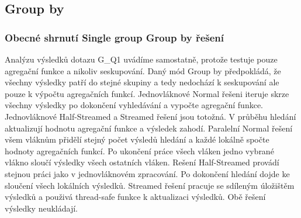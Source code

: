 \subsection{Group by}

\subsubsection{Obecné shrnutí Single group Group by řešení}

Analýzu výsledků dotazu G\_Q1 uvádíme samostatně, protože testuje pouze agregační funkce a nikoliv seskupování.
Daný mód Group by předpokládá, že všechny výsledky patří do stejné skupiny a tedy nedochází k seskupování ale pouze k výpočtu agregačních funkcí.
Jednovláknové Normal řešeni iteruje skrze všechny výsledky po dokončení vyhledávání a vypočte agregační funkce.
Jednovláknové Half-Streamed a Streamed řešení jsou totožná.
V průběhu hledání aktualizují hodnotu agregační funkce a výsledek zahodí. 
Paralelní Normal řešení všem vláknům přidělí stejný počet výsledů hledání a každé lokálně spočte hodnoty agregačních funkcí.
Po ukončení práce všech vláken jedno vybrané vlákno sloučí výsledky všech ostatních vláken. 
Rešení Half-Streamed provádí stejnou práci jako v jednovláknovém zpracování.
Po dokončení hledání dojde ke sloučení všech lokálních výsledků.
Streamed řešení pracuje se sdíleným úložištěm výsledků a použivá thread-safe funkce k aktualizaci výsledků.
Obě řešení výsledky neukládají.

